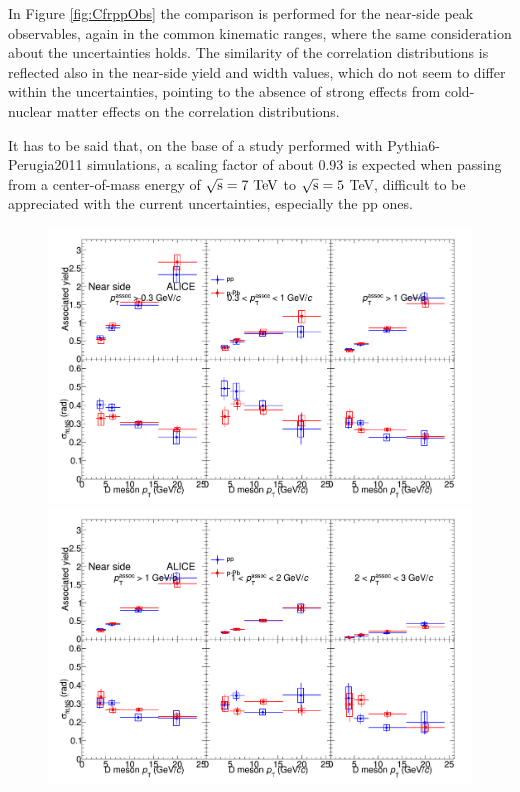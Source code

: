 In Figure \ref{fig:CfrppObs} the comparison is performed for the near-side peak observables, again in the common kinematic ranges, where the same consideration about the uncertainties holds. The similarity of the correlation distributions is reflected also in the near-side yield and width values, which do not seem to differ within the uncertainties, pointing to the absence of strong effects from cold-nuclear matter effects on the correlation distributions.

It has to be said that, on the base of a study performed with Pythia6-Perugia2011 simulations, a scaling factor of about 0.93 is expected when passing from a center-of-mass energy of $\rm{\sqrt{s}= 7 ~ TeV}$ to $\rm{\sqrt{s}= 5}$ TeV, difficult to be appreciated with the current uncertainties, especially the pp ones.

\begin{figure}[!htbp]
\centering
{\includegraphics[width=\linewidth]{figures/CfrPPandModels/CompareFitResults_ppVspPb_5TeV_1.png}}
{\includegraphics[width=\linewidth]{figures/CfrPPandModels/CompareFitResults_ppVspPb_5TeV_2.png}}
\end{figure}
